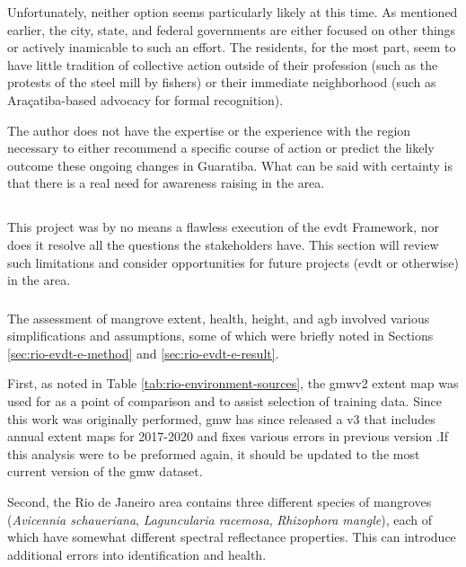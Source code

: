 Unfortunately, neither option seems particularly likely at this time. As mentioned earlier, the city, state, and federal governments are either focused on other things or actively inamicable to such an effort. The residents, for the most part, seem to have little tradition of collective action outside of their profession (such as the protests of the steel mill by fishers) or their immediate neighborhood (such as Araçatiba-based advocacy for formal recognition). 

The author does not have the expertise or the experience with the region necessary to either recommend a specific course of action or predict the likely outcome these ongoing changes in Guaratiba. What can be said with certainty is that there is a real need for awareness raising in the area.

\subsection{} \label{sec:rio-limitations}

This project was by no means a flawless execution of the \ac{evdt} Framework, nor does it resolve all the questions the stakeholders have. This section will review such limitations and consider opportunities for future projects (\ac{evdt} or otherwise) in the area. 

\subsubsection{}

The assessment of mangrove extent, health, height, and \ac{agb} involved various simplifications and assumptions, some of which were briefly noted in Sections \ref{sec:rio-evdt-e-method} and \ref{sec:rio-evdt-e-result}. 

First, as noted in Table \ref{tab:rio-environment-sources}, the \ac{gmw}v2 extent map was used for as a point of comparison and to assist selection of training data. Since this work was originally performed, \ac{gmw} has since released a v3 that includes annual extent maps for 2017-2020 and fixes various errors in previous version \cite{buntingGlobalMangroveExtent2022}.If this analysis were to be preformed again, it should be updated to the most current version of the \ac{gmw} dataset.

Second, the Rio de Janeiro area contains three different species of mangroves (\textit{Avicennia schaueriana}, \textit{Laguncularia racemosa}, \textit{Rhizophora mangle}), each of which have somewhat different spectral reflectance properties. This can introduce additional errors into identification and health.


